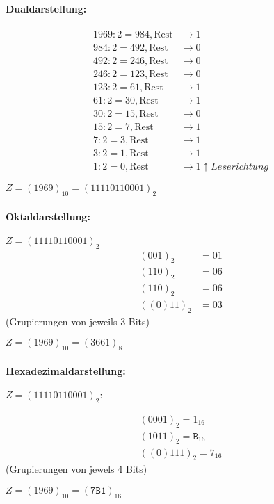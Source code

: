 \documentclass[11pt,a4paper]{article}
\begin{document}
\paragraph{Dualdarstellung:}
\begin{align*}
1969 : 2 = 984, \mbox{Rest} &\rightarrow 1\\
984 : 2 = 492, \mbox{Rest} &\rightarrow 0\\
492 : 2 = 246, \mbox{Rest} &\rightarrow 0\\
246 : 2 = 123, \mbox{Rest} &\rightarrow 0\\
123 : 2 = 61, \mbox{Rest} &\rightarrow 1\\
61 : 2 = 30, \mbox{Rest} &\rightarrow 1\\
30 : 2= 15, \mbox{Rest} &\rightarrow 0\\
15 : 2 = 7, \mbox{Rest} &\rightarrow 1\\
7 : 2 = 3, \mbox{Rest} &\rightarrow 1\\
3 : 2 = 1, \mbox{Rest} &\rightarrow 1\\
1 : 2 = 0, \mbox{Rest} &\rightarrow 1 \uparrow Leserichtung
\end{align*}

$Z = (1969)_{10} =  (11110110001)_2$

\paragraph{Oktaldarstellung:}
$Z = (11110110001)_2$
\begin{align*}
(001)_2 &= 01\\
(110)_2 &= 06\\
(110)_2 &= 06\\
((0)11)_2 &= 03
\end{align*}
(Grupierungen von jeweils 3 Bits)

$Z = (1969)_{10} = (3661)_{8}$

\paragraph{Hexadezimaldarstellung:}
$Z = (11110110001)_2:$

\begin{align*}
(0001)_2 = 1_{16}\\
(1011)_2 = \mathtt{B}_{16}\\
((0)111)_2= 7_{16}
\end{align*}
(Grupierungen von jewels 4 Bits)

$Z = (1969)_{10} = (\mathtt{7B1})_{16}$
\end{document}
